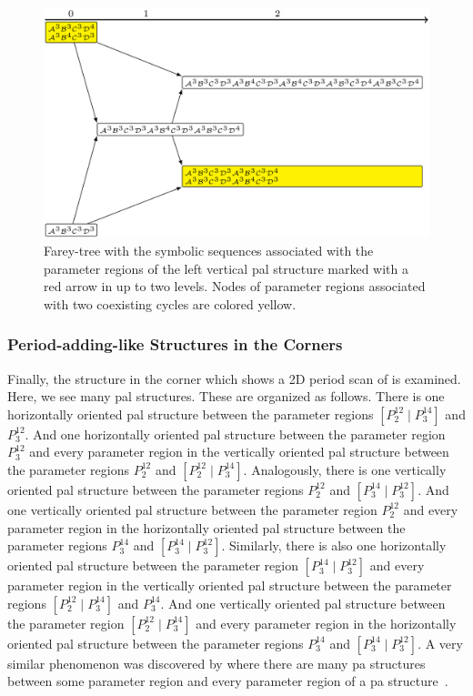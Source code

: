 \begin{figure}
	\centering
	\includegraphics[width=.7 \textwidth]{../Figures/7/7.15+17/adding.png}
	\caption[Farey-tree with the symbolic sequences of a horizontal  structure]{
		Farey-tree with the symbolic sequences associated with the parameter regions of the left vertical \gls{pal} structure marked with a red arrow in  up to two levels.
		Nodes of parameter regions associated with two coexisting cycles are colored yellow.
	}
	\label{fig:add.add.like.vert.tree}
\end{figure}

\subsubsection{Period-adding-like Structures in the Corners}

Finally, the structure in the corner which  shows a 2D period scan of is examined.
Here, we see many \gls{pal} structures.
These are organized as follows.
There is one horizontally oriented \gls{pal} structure between the parameter regions $\left[P^{12}_2 \mid P^{14}_3\right]$ and $P^{12}_3$.
And one horizontally oriented \gls{pal} structure between the parameter region $P^{12}_3$ and every parameter region in the vertically oriented \gls{pal} structure between the parameter regions $P^{12}_2$ and $\left[P^{12}_2 \mid P^{14}_3\right]$.
Analogously, there is one vertically oriented \gls{pal} structure between the parameter regions $P^{12}_2$ and $\left[P^{14}_3 \mid P^{12}_3\right]$.
And one vertically oriented \gls{pal} structure between the parameter region $P^{12}_2$ and every parameter region in the horizontally oriented \gls{pal} structure between the parameter regions $P^{14}_3$ and $\left[P^{14}_3 \mid P^{12}_3\right]$.
Similarly, there is also one horizontally oriented \gls{pal} structure between the parameter region $\left[P^{14}_3 \mid P^{12}_3\right]$ and every parameter region in the vertically oriented \gls{pal} structure between the parameter regions $\left[P^{12}_2 \mid P^{14}_3\right]$ and $P^{14}_3$.
And one vertically oriented \gls{pal} structure between the parameter region $\left[P^{12}_2 \mid P^{14}_3\right]$ and every parameter region in the horizontally oriented \gls{pal} structure between the parameter regions $P^{14}_3$ and $\left[P^{14}_3 \mid P^{12}_3\right]$.
A very similar phenomenon was discovered by  where there are many \gls{pa} structures between some parameter region and every parameter region of a \gls{pa} structure~\cite{tramontana2012period}.

